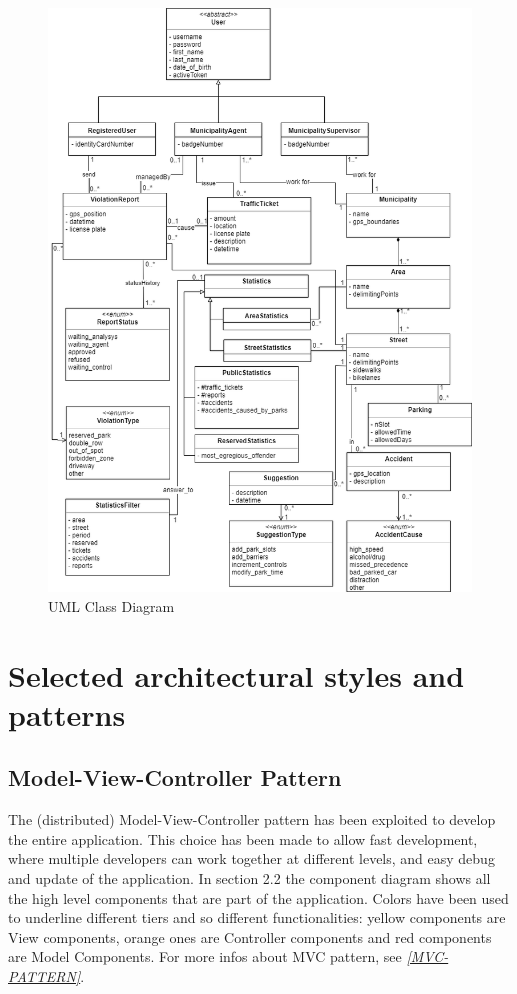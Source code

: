 \documentclass[a4paper]{report}
\begin{document}
\begin{figure}[htp]
\includegraphics[width=\textwidth]{ClassDiagramDD}
\caption{UML Class Diagram}
\label{fig:class-diagram}
\end{figure}
\restoregeometry
\section{Selected architectural	styles and patterns}
\subsection{Model-View-Controller Pattern}
The (distributed) Model-View-Controller pattern has been exploited to develop the entire application.  This choice has been made to allow fast development, where multiple developers can work together at different levels, and easy debug and update of the application. In section 2.2 the component diagram shows all the high level components that are part of the application. Colors have been used to underline different tiers and so different functionalities: yellow components are View components, orange ones are Controller components and red components are Model Components. For more infos about MVC pattern, see \label{use:MVC-pattern} \hyperref[ref:MVC-pattern]{\textit{[MVC-PATTERN]}}.
\end{document}
